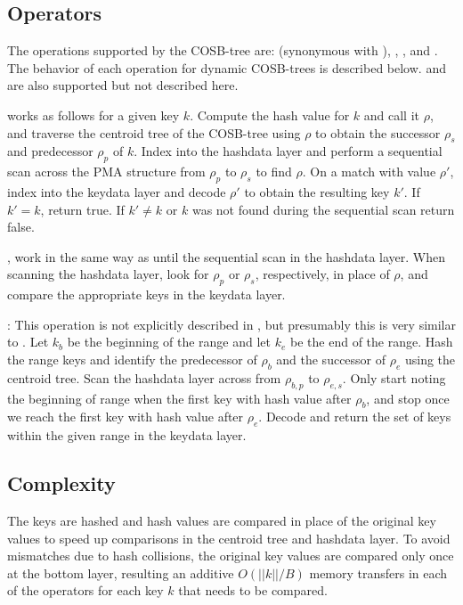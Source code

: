 \documentclass[preprint]{style}
\begin{document}
\subsection{Operators}


The operations supported by the COSB-tree are: \Search{} (synonymous with \Member{}), \Pred{}, \Succ{},
and \Scan{}. The behavior of each operation for dynamic COSB-trees is
described below. \Insertkonly{} and \Delete{} are also supported but not
described here.

\Search{} works as follows for a given key $k$. Compute the hash value for
$k$ and call it $\rho$, and traverse the centroid tree of the COSB-tree using
$\rho$ to obtain the successor $\rho_{s}$ and predecessor $\rho_{p}$ of $k$.
Index into the hashdata layer and perform a sequential scan across the PMA
structure from $\rho_{p}$ to $\rho_{s}$ to find $\rho$. On a match with value
$\rho'$, index into the keydata layer and decode $\rho'$ to obtain the
resulting key $k'$. If $k' = k$, return true. If $k' \ne k$ or $k$ was not
found during the sequential scan return false.

\Pred{}, \Succ{} work in the same way as \Search{} until the sequential scan in
the hashdata layer. When scanning the hashdata layer, look for $\rho_{p}$ or
$\rho_{s}$, respectively, in place of $\rho$, and compare the appropriate keys
in the keydata layer.

\Scan{}: This operation is not explicitly described in \cite{BenderFaKu06}, but
presumably this is very similar to \Search{}. Let $k_{b}$ be the beginning of
the range and let $k_{e}$ be the end of the range. Hash the range keys and
identify the predecessor of $\rho_{b}$ and the successor of $\rho_{e}$ using
the centroid tree. Scan the hashdata layer across from $\rho_{b,p}$ to
$\rho_{e,s}$. Only start noting the beginning of range when the first key with
hash value after $\rho_{b}$, and stop once we reach the first key with hash
value after $\rho_{e}$. Decode and return the set of keys within the given
range in the keydata layer.

\subsection{Complexity}
The keys are hashed and hash values are compared in place of the original key
values to speed up comparisons in the centroid tree and hashdata layer. To
avoid mismatches due to hash collisions, the original key values are compared
only once at the bottom layer, resulting an additive $O(||k||/B)$ memory
transfers in each of the operators for each key $k$ that needs to be compared.
\end{document}

